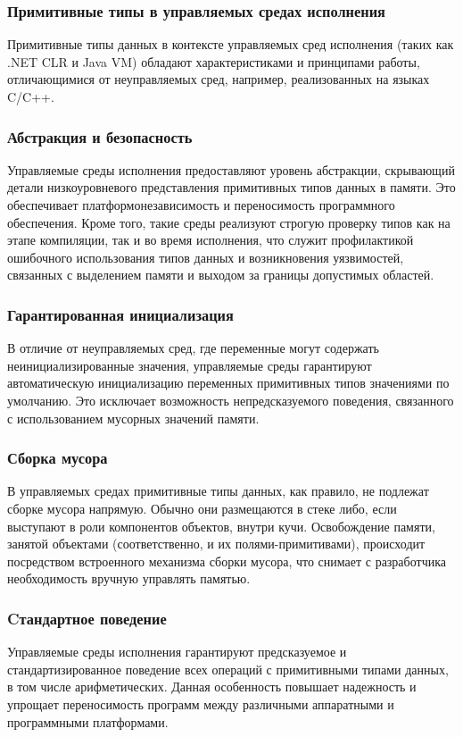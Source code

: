\subsubsection{Примитивные типы в управляемых средах исполнения}

Примитивные типы данных в контексте управляемых сред исполнения (таких как .NET CLR и Java VM) обладают характеристиками и принципами работы,
отличающимися от неуправляемых сред, например, реализованных на языках C/C++.


\subsubsection*{Абстракция и безопасность}
Управляемые среды исполнения предоставляют уровень абстракции, скрывающий детали низкоуровневого представления примитивных типов данных в памяти. Это обеспечивает платформонезависимость и переносимость программного обеспечения.
Кроме того, такие среды реализуют строгую проверку типов как на этапе компиляции, так и во время исполнения, что служит профилактикой ошибочного использования типов данных и возникновения уязвимостей, связанных с выделением памяти и выходом за границы допустимых областей.

\subsubsection*{Гарантированная инициализация}
В отличие от неуправляемых сред, где переменные могут содержать неинициализированные значения, управляемые среды гарантируют автоматическую инициализацию переменных
примитивных типов значениями по умолчанию. Это исключает возможность непредсказуемого поведения, связанного с использованием мусорных значений памяти.

\subsubsection*{Сборка мусора}
В управляемых средах примитивные типы данных, как правило, не подлежат сборке мусора напрямую. Обычно они размещаются в стеке либо, если выступают в роли компонентов объектов, внутри кучи. Освобождение памяти, занятой объектами (соответственно, и их полями-примитивами),
происходит посредством встроенного механизма сборки мусора, что снимает с разработчика необходимость вручную управлять памятью.

\subsubsection*{Cтандартное поведение}
Управляемые среды исполнения гарантируют предсказуемое и стандартизированное поведение всех операций с примитивными типами данных, в том числе арифметических.
Данная особенность повышает надежность и упрощает переносимость программ между различными аппаратными и программными платформами.

